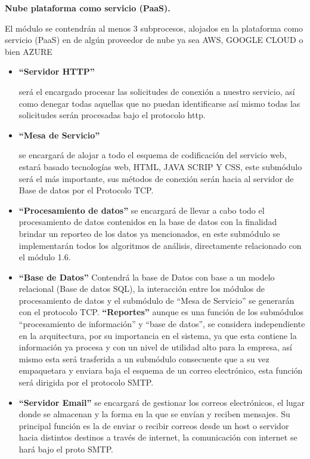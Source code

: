 \textbf{Nube plataforma como servicio (PaaS).}

El módulo  se contendrán al menos 3 subprocesos, alojados en la plataforma como servicio (PaaS) en de algún proveedor de nube ya sea AWS, GOOGLE CLOUD o bien AZURE 
\begin{itemize}

\item \textbf{“Servidor HTTP” }

 será el encargado procesar las solicitudes de conexión a nuestro servicio, así como denegar todas aquellas que no puedan identificarse así mismo todas las solicitudes serán procesadas bajo el protocolo http.
 
\item \textbf{“Mesa de Servicio” }

se encargará de alojar a todo el esquema de codificación del servicio web, estará basado tecnologías web, HTML, JAVA SCRIP Y CSS, este submódulo será el más importante, sus métodos de conexión serán hacia al servidor de Base de datos por el Protocolo TCP.
\item \textbf{“Procesamiento de datos” }
se encargará de llevar a cabo todo el procesamiento de datos contenidos en la base de datos con la finalidad brindar un reporteo de los datos ya mencionados, en este submódulo se implementarán todos los algoritmos de análisis, directamente relacionado con el módulo 1.6.

\item \textbf{“Base de Datos” }
Contendrá la base de Datos con base a un modelo relacional (Base de datos SQL), la interacción entre los módulos de procesamiento de datos y el submódulo de “Mesa de Servicio” se generarán con el protocolo TCP.
\textbf{“Reportes”}
 aunque es una función de los submódulos “procesamiento de información” y “base de datos”, se considera independiente en la arquitectura, por su importancia en el sistema, ya que esta contiene la información ya procesa y con un nivel de utilidad alto para la empresa, así mismo esta   será trasferida a  un submódulo consecuente que a su vez empaquetara y enviara baja el esquema de un correo electrónico, esta función será dirigida por el protocolo SMTP.

\item  \textbf{“Servidor Email”} se encargará de gestionar los correos electrónicos, el lugar donde se almacenan y la forma en la que se envían y reciben mensajes. Su principal función es la de enviar o recibir correos desde un host o servidor hacia distintos destinos a través de internet, la comunicación con internet se hará bajo el proto SMTP.

\end{itemize}


